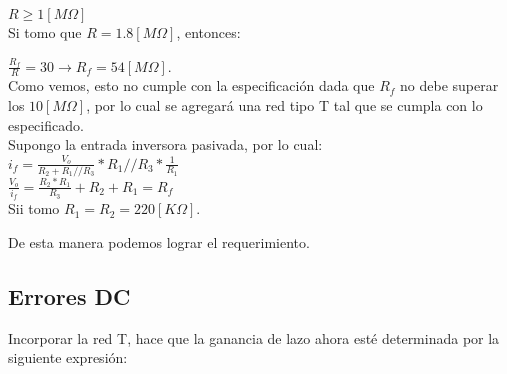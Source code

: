 $R \ge 1[M\Omega] $\\

Si tomo que $R=1.8 [M\Omega]$, entonces:

$\frac{R_{f}}{R} = 30 \xrightarrow{} R_{f} = 54 [M\Omega]$.\\

Como vemos, esto no cumple con la especificación dada que $R_f$ no debe superar los $10 [M\Omega]$, por lo cual se agregará una red tipo T tal que se cumpla con lo especificado.\\

Supongo la entrada inversora pasivada, por lo cual:\\

$i_f = \frac{V_o}{R_2 + R_1//R_3}* R_1//R_3 * \frac{1}{R_1}$\\

$\frac{V_o}{i_f} = \frac{R_2*R_1}{R_3} + R_2 + R_1 = R_f$\\

Sii tomo $R_1 = R_2 = 220 [K\Omega]$.\\

\begin{center}
\end{center}

De esta manera podemos lograr el requerimiento.\\

\subsection{Errores DC}
Incorporar la red T, hace que la ganancia de lazo ahora esté determinada por la siguiente expresión:\\

\begin{center}
\end{center}

